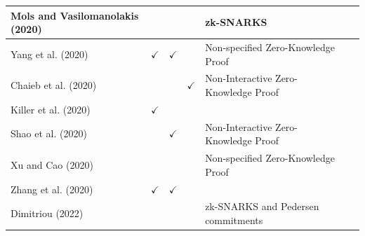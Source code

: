 \documentclass[../access.tex]{subfiles}
\begin{document}
\begin{table}[htbp]
\begin{adjustwidth}{-2cm}{}
\begin{tabular}{m{4.4cm} c >{\centering\arraybackslash}m{1.7cm} c >{\centering\arraybackslash}m{6cm} >{\centering\arraybackslash} m{1.0cm} >{\centering\arraybackslash}m{14.9cm}}
            \hline
            \footnotesize{Mols and Vasilomanolakis (2020) \cite{Mols2020}} & {}                                                   & {}                                   & {}                      & \footnotesize{zk-SNARKS}                                                                 \\
            \hline
            \footnotesize{Yang et al. (2020) \cite{Yang2020}}              & $ \checkmark $                                       & $ \checkmark $                       & {}                      & \footnotesize{Non-specified Zero-Knowledge Proof}                                        \\
            \hline
            \footnotesize{Chaieb et al. (2020) \cite{Chaieb2020}}          & {}                                                   & {}                                   & $ \checkmark $          & \footnotesize{Non-Interactive Zero-Knowledge Proof}                                      \\
            \hline
            \footnotesize{Killer et al. (2020) \cite{Killer2020}}          & $ \checkmark $                                       & {}                                   & {}                      & {}                                                                                       \\
            \hline
            \footnotesize{Shao et al. (2020) \cite{Shao2020}}              & {}                                                   & $ \checkmark $                       & {}                      & \footnotesize{Non-Interactive Zero-Knowledge Proof}                                      \\
            \hline
            \footnotesize{Xu and Cao (2020) \cite{Xu2020}}                 & {}                                                   & {}                                   & {}                      & \footnotesize{Non-specified Zero-Knowledge Proof}                                        \\
            \hline
            \footnotesize{Zhang et al. (2020) \cite{Zhang2020}}            & $ \checkmark $                                       & $ \checkmark $                       & {}                      & {}                                                                                       \\
            \hline
            \footnotesize{Dimitriou (2022) \cite{Dimitriou2020}}           & {}                                                   & {}                                   & {}                      & \footnotesize{zk-SNARKS and Pedersen commitments}                                        \\

\end{tabular}
\end{adjustwidth}
\end{table}
\end{document}
